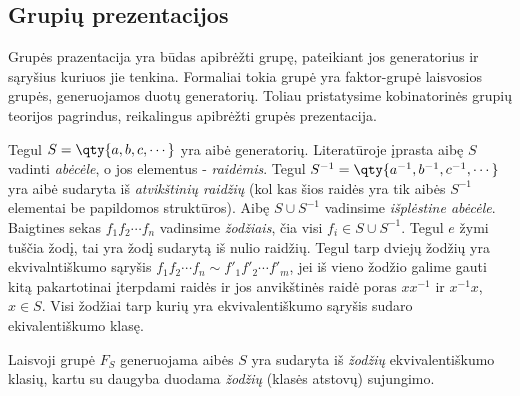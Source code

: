 
\subsection{Grupių prezentacijos}

Grupės prazentacija yra būdas apibrėžti grupę,
pateikiant jos generatorius ir sąryšius kuriuos jie tenkina.
Formaliai tokia grupė yra faktor-grupė laisvosios grupės,
generuojamos duotų generatorių.
Toliau pristatysime kobinatorinės grupių teorijos pagrindus,
reikalingus apibrėžti grupės prezentacija.

Tegul $S = \qty{a,b,c,\cdots}$ yra aibė generatorių.
Literatūroje įprasta aibę $S$ vadinti \emph{abėcėle}, 
o jos elementus - \emph{raidėmis}.
Tegul $S^{-1} = \qty{a^{-1},b^{-1},c^{-1},\cdots}$
yra aibė sudaryta iš \emph{atvikštinių raidžių}
(kol kas šios raidės yra tik aibės $S^{-1}$ elementai be papildomos struktūros).
Aibę $S \cup S^{-1}$ vadinsime \emph{išplėstine abėcėle}.
Baigtines sekas $ f_1 f_2 \cdots f_n$ vadinsime \emph{žodžiais},
čia visi $f_i \in S \cup S^{-1}$.
Tegul $e$ žymi tuščia žodį,
tai yra žodį sudarytą iš nulio raidžių.
Tegul tarp dviejų žodžių yra ekvivalntiškumo sąryšis
$f_1 f_2 \cdots f_n \sim f'_1 f'_2 \cdots f'_m$,
jei iš vieno žodžio galime gauti kitą
pakartotinai įterpdami raidės ir jos anvikštinės raidė poras $xx^{-1}$ ir $x^{-1}x$, $x \in S$.
Visi žodžiai tarp kurių yra ekvivalentiškumo sąryšis sudaro ekivalentiškumo klasę.
\begin{definition}
	Laisvoji grupė $F_S$ generuojama aibės $S$ yra sudaryta iš
	\emph{žodžių} ekvivalentiškumo klasių,
	kartu su daugyba duodama \emph{žodžių} (klasės atstovų) sujungimo.
\end{definition}

